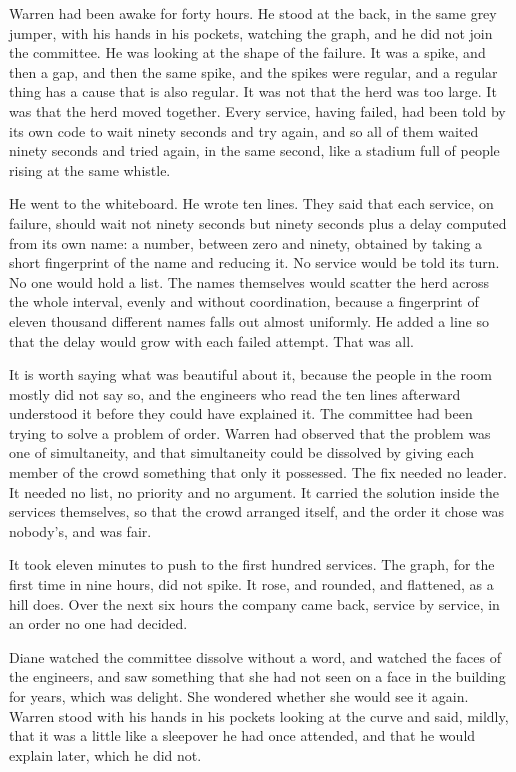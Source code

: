 Warren had been awake for forty hours. He stood at the back, in the same grey jumper, with his hands in his pockets, watching the graph, and he did not join the committee. He was looking at the shape of the failure. It was a spike, and then a gap, and then the same spike, and the spikes were regular, and a regular thing has a cause that is also regular. It was not that the herd was too large. It was that the herd moved together. Every service, having failed, had been told by its own code to wait ninety seconds and try again, and so all of them waited ninety seconds and tried again, in the same second, like a stadium full of people rising at the same whistle.

He went to the whiteboard. He wrote ten lines. They said that each service, on failure, should wait not ninety seconds but ninety seconds plus a delay computed from its own name: a number, between zero and ninety, obtained by taking a short fingerprint of the name and reducing it. No service would be told its turn. No one would hold a list. The names themselves would scatter the herd across the whole interval, evenly and without coordination, because a fingerprint of eleven thousand different names falls out almost uniformly. He added a line so that the delay would grow with each failed attempt. That was all.

It is worth saying what was beautiful about it, because the people in the room mostly did not say so, and the engineers who read the ten lines afterward understood it before they could have explained it. The committee had been trying to solve a problem of order. Warren had observed that the problem was one of simultaneity, and that simultaneity could be dissolved by giving each member of the crowd something that only it possessed. The fix needed no leader. It needed no list, no priority and no argument. It carried the solution inside the services themselves, so that the crowd arranged itself, and the order it chose was nobody's, and was fair.

It took eleven minutes to push to the first hundred services. The graph, for the first time in nine hours, did not spike. It rose, and rounded, and flattened, as a hill does. Over the next six hours the company came back, service by service, in an order no one had decided.

Diane watched the committee dissolve without a word, and watched the faces of the engineers, and saw something that she had not seen on a face in the building for years, which was delight. She wondered whether she would see it again. Warren stood with his hands in his pockets looking at the curve and said, mildly, that it was a little like a sleepover he had once attended, and that he would explain later, which he did not.

